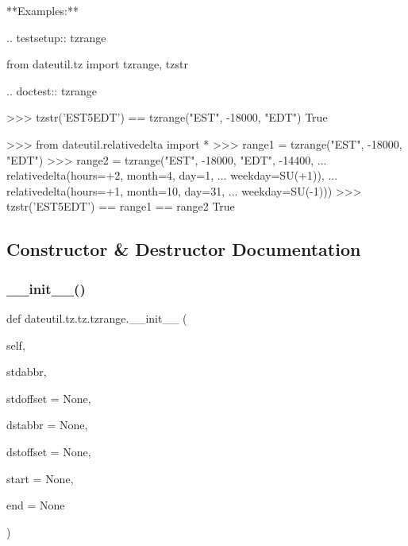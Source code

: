 \begin{DoxyVerb}
**Examples:**

.. testsetup:: tzrange

    from dateutil.tz import tzrange, tzstr

.. doctest:: tzrange

    >>> tzstr('EST5EDT') == tzrange("EST", -18000, "EDT")
    True

    >>> from dateutil.relativedelta import *
    >>> range1 = tzrange("EST", -18000, "EDT")
    >>> range2 = tzrange("EST", -18000, "EDT", -14400,
    ...                  relativedelta(hours=+2, month=4, day=1,
    ...                                weekday=SU(+1)),
    ...                  relativedelta(hours=+1, month=10, day=31,
    ...                                weekday=SU(-1)))
    >>> tzstr('EST5EDT') == range1 == range2
    True\end{DoxyVerb}
 

\subsection{Constructor \& Destructor Documentation}
\mbox{\label{classdateutil_1_1tz_1_1tz_1_1tzrange_a52f4af837a27b0ef43c6f25177a92c2d}} 
\subsubsection{\texorpdfstring{\+\_\+\+\_\+init\+\_\+\+\_\+()}{\_\_init\_\_()}}
{\footnotesize\ttfamily def dateutil.\+tz.\+tz.\+tzrange.\+\_\+\+\_\+init\+\_\+\+\_\+ (\begin{DoxyParamCaption}\item[{}]{self,  }\item[{}]{stdabbr,  }\item[{}]{stdoffset = {\ttfamily None},  }\item[{}]{dstabbr = {\ttfamily None},  }\item[{}]{dstoffset = {\ttfamily None},  }\item[{}]{start = {\ttfamily None},  }\item[{}]{end = {\ttfamily None} }\end{DoxyParamCaption})}



